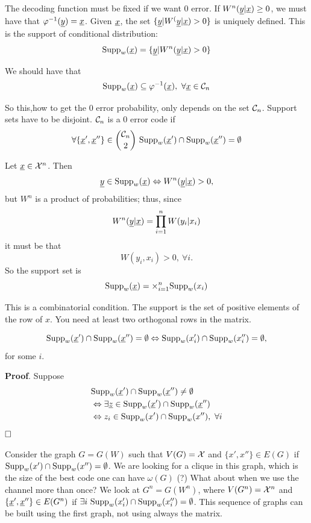 The decoding function must be fixed if we want $0$ error. If $W^n(\underline{y}|\underline{x}) \geq 0$, we must have that $\varphi^{-1}(\underline{y}) = \underline{x}$. Given $\underline{x}$, the set $\{\underline{y}| W^(\underline{y}|\underline{x})>0 \}$ is uniquely defined. This is the support of conditional distribution:
\begin{equation}
\text{Supp}_w(\underline{x}) = \{\underline{y}| W^n(\underline{y}|\underline{x})>0 \}
\end{equation}

We should have that 
\[
\text{Supp}_w(\underline{x}) \subseteq \varphi^{-1}(\underline{x}),\ \forall\underline{x} \in \mathcal{C}_n
\]

So this,\ie how to get the 0 error probability, only depends on the set $\mathcal{C}_n$. Support sets have to be disjoint. $\mathcal{C}_n$ is a $0$ error code if
\[
\forall \{\underline{x}',\underline{x}'' \} \in \binom{\mathcal{C}_n}{2}\ \text{Supp}_w(\underline{x}') \cap \text{Supp}_w(\underline{x}'') = \emptyset
\]

\begin{obs}
	Let $\underline{x} \in \mathcal{X}^n$. Then $$\underline{y} \in \text{Supp}_w(\underline{x}) \Leftrightarrow W^n(\underline{y}|\underline{x}) >0,$$ but $W^n$ is a product of probabilities; thus, since
	$$W^n(\underline{y}|\underline{x}) = \prod_{i=1}^nW(y_i|x_i)$$
	it must be that
	$$W(y_i, x_i) > 0,\ \forall i.$$ So the support set is $$\text{Supp}_w(\underline{x}) = \times_{i=1}^n\text{Supp}_w(x_i)$$
\end{obs}

This is a combinatorial condition. The support is the set of positive elements of the row of $x$. You need at least two orthogonal rows in the matrix.

\begin{obs}
	$$\text{Supp}_w(\underline{x}') \cap \text{Supp}_w(\underline{x}'') = \emptyset \Leftrightarrow \text{Supp}_w(x_i') \cap \text{Supp}_w(x_i'') = \emptyset,$$ for some $i$. 
\end{obs}
\noindent\textbf{Proof}. Suppose 
\begin{align*}
	&\text{Supp}_w(\underline{x}') \cap \text{Supp}_w(\underline{x}'') \not= \emptyset\\
	&\Leftrightarrow \exists\underline{z} \in \text{Supp}_w(\underline{x}') \cap \text{Supp}_w(\underline{x}'')\\
	& \Leftrightarrow z_i \in \text{Supp}_w(x') \cap \text{Supp}_w(x''),\ \forall i
\end{align*}
$\hfill\Box$

Consider the graph $G = G(W)$ such that $V(G) = \mathcal{X}$ and $\{x',x'' \} \in E(G)$ if $\text{Supp}_w(x') \cap \text{Supp}_w(x'') = \emptyset$. We are looking for a clique in this graph, which is the size of the best code one can have $\omega(G)$ (?) What about when we use the channel more than once? We look at $G^n = G(W^n)$, where $V(G^n) = \mathcal{X}^n$ and $\{\underline{x}',\underline{x}''\} \in E(G^n)$ if $\exists i\ \text{Supp}_w(x_i') \cap \text{Supp}_w(x_i'') = \emptyset$. This sequence of graphs can be built using the first graph, not using always the matrix.

